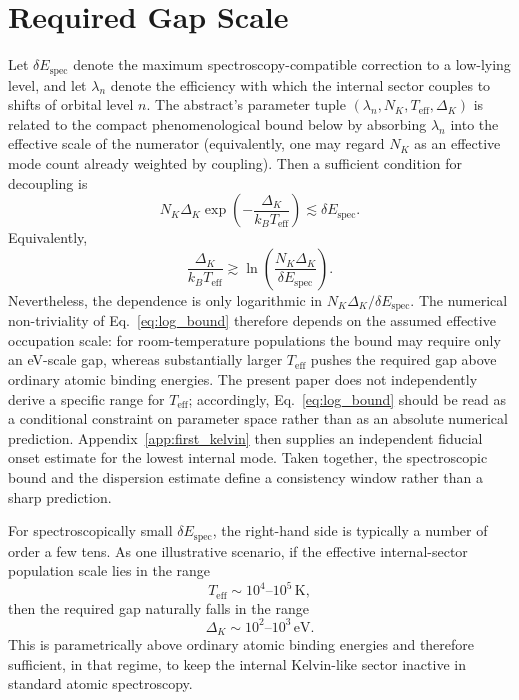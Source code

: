 \documentclass[pdflatex,sn-mathphys-num]{sn-jnl}
\begin{document}
    \section{Required Gap Scale}\label{sec:required_gap}
        Let $\delta E_{\mathrm{spec}}$ denote the maximum spectroscopy-compatible correction to a low-lying level, and let $\lambda_n$ denote the efficiency with which the internal sector couples to shifts of orbital level $n$. The abstract's parameter tuple $(\lambda_n,N_K,T_{\mathrm{eff}},\Delta_K)$ is related to the compact phenomenological bound below by absorbing $\lambda_n$ into the effective scale of the numerator (equivalently, one may regard $N_K$ as an effective mode count already weighted by coupling). Then a sufficient condition for decoupling is
        \begin{equation}
            N_K \Delta_K
            \exp\!\left(-\frac{\Delta_K}{k_B T_{\mathrm{eff}}}\right)
            \lesssim
            \delta E_{\mathrm{spec}}.
            \label{eq:general_bound}
        \end{equation}
        Equivalently,
        \begin{equation}
            \frac{\Delta_K}{k_B T_{\mathrm{eff}}}
            \gtrsim
            \ln\!\left(\frac{N_K \Delta_K}{\delta E_{\mathrm{spec}}}\right).
            \label{eq:log_bound}
        \end{equation}
        Nevertheless, the dependence is only logarithmic in $N_K \Delta_K/\delta E_{\mathrm{spec}}$. The numerical non-triviality of Eq.~\eqref{eq:log_bound} therefore depends on the assumed effective occupation scale: for room-temperature populations the bound may require only an eV-scale gap, whereas substantially larger $T_{\mathrm{eff}}$ pushes the required gap above ordinary atomic binding energies. The present paper does not independently derive a specific range for $T_{\mathrm{eff}}$; accordingly, Eq.~\eqref{eq:log_bound} should be read as a conditional constraint on parameter space rather than as an absolute numerical prediction. Appendix~\ref{app:first_kelvin} then supplies an independent fiducial onset estimate for the lowest internal mode. Taken together, the spectroscopic bound and the dispersion estimate define a consistency window rather than a sharp prediction.

        For spectroscopically small $\delta E_{\mathrm{spec}}$, the right-hand side is typically a number of order a few tens. As one illustrative scenario, if the effective internal-sector population scale lies in the range
        \begin{equation}
            T_{\mathrm{eff}} \sim 10^4\text{--}10^5\,\mathrm{K},
        \end{equation}
        then the required gap naturally falls in the range
        \begin{equation}
            \Delta_K \sim 10^2\text{--}10^3\,\mathrm{eV}.
        \end{equation}
        This is parametrically above ordinary atomic binding energies and therefore sufficient, in that regime, to keep the internal Kelvin-like sector inactive in standard atomic spectroscopy.
\end{document}
